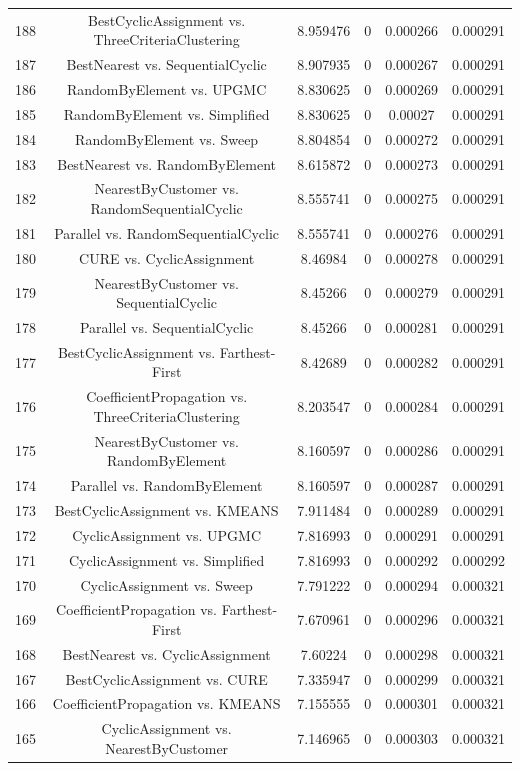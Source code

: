 \documentclass[a4paper,10pt]{article}
\begin{document}
\begin{landscape}
\begin{table}[!htp]
\begin{tabular}{cccccc}
188&BestCyclicAssignment vs. ThreeCriteriaClustering&8.959476&0&0.000266&0.000291\\
187&BestNearest vs. SequentialCyclic&8.907935&0&0.000267&0.000291\\
186&RandomByElement vs. UPGMC&8.830625&0&0.000269&0.000291\\
185&RandomByElement vs. Simplified&8.830625&0&0.00027&0.000291\\
184&RandomByElement vs. Sweep&8.804854&0&0.000272&0.000291\\
183&BestNearest vs. RandomByElement&8.615872&0&0.000273&0.000291\\
182&NearestByCustomer vs. RandomSequentialCyclic&8.555741&0&0.000275&0.000291\\
181&Parallel vs. RandomSequentialCyclic&8.555741&0&0.000276&0.000291\\
180&CURE vs. CyclicAssignment&8.46984&0&0.000278&0.000291\\
179&NearestByCustomer vs. SequentialCyclic&8.45266&0&0.000279&0.000291\\
178&Parallel vs. SequentialCyclic&8.45266&0&0.000281&0.000291\\
177&BestCyclicAssignment vs. Farthest-First&8.42689&0&0.000282&0.000291\\
176&CoefficientPropagation vs. ThreeCriteriaClustering&8.203547&0&0.000284&0.000291\\
175&NearestByCustomer vs. RandomByElement&8.160597&0&0.000286&0.000291\\
174&Parallel vs. RandomByElement&8.160597&0&0.000287&0.000291\\
173&BestCyclicAssignment vs. KMEANS&7.911484&0&0.000289&0.000291\\
172&CyclicAssignment vs. UPGMC&7.816993&0&0.000291&0.000291\\
171&CyclicAssignment vs. Simplified&7.816993&0&0.000292&0.000292\\
170&CyclicAssignment vs. Sweep&7.791222&0&0.000294&0.000321\\
169&CoefficientPropagation vs. Farthest-First&7.670961&0&0.000296&0.000321\\
168&BestNearest vs. CyclicAssignment&7.60224&0&0.000298&0.000321\\
167&BestCyclicAssignment vs. CURE&7.335947&0&0.000299&0.000321\\
166&CoefficientPropagation vs. KMEANS&7.155555&0&0.000301&0.000321\\
165&CyclicAssignment vs. NearestByCustomer&7.146965&0&0.000303&0.000321\\

\end{tabular}
\end{table}
\end{landscape}
\end{document}
